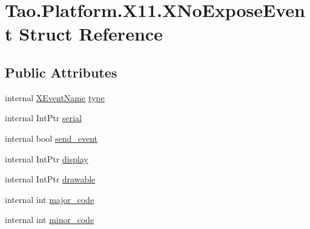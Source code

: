 \hypertarget{struct_tao_1_1_platform_1_1_x11_1_1_x_no_expose_event}{
\section{Tao.Platform.X11.XNoExposeEvent Struct Reference}
\label{struct_tao_1_1_platform_1_1_x11_1_1_x_no_expose_event}
}
\subsection*{Public Attributes}
\begin{DoxyCompactItemize}
\item 
internal \hyperlink{namespace_tao_1_1_platform_1_1_x11_aff81ed5b8778e1ea8e872861dff9f146}{XEventName} \hyperlink{struct_tao_1_1_platform_1_1_x11_1_1_x_no_expose_event_ada56c9399b1ca7dad19d2a1ba246c026}{type}
\item 
internal IntPtr \hyperlink{struct_tao_1_1_platform_1_1_x11_1_1_x_no_expose_event_a3c9a6088bf77089a254525097311eb69}{serial}
\item 
internal bool \hyperlink{struct_tao_1_1_platform_1_1_x11_1_1_x_no_expose_event_acc38f809e10d559bc0f33dc103504b46}{send\_\-event}
\item 
internal IntPtr \hyperlink{struct_tao_1_1_platform_1_1_x11_1_1_x_no_expose_event_a5092fdfef54b3c792bcb97c3c893130f}{display}
\item 
internal IntPtr \hyperlink{struct_tao_1_1_platform_1_1_x11_1_1_x_no_expose_event_a01cf958486a0894186377e2e57673010}{drawable}
\item 
internal int \hyperlink{struct_tao_1_1_platform_1_1_x11_1_1_x_no_expose_event_a1b644e345a353c6f1ba8db995854071e}{major\_\-code}
\item 
internal int \hyperlink{struct_tao_1_1_platform_1_1_x11_1_1_x_no_expose_event_a4aafa728ba5bec496e2479bf52d6ab95}{minor\_\-code}
\end{DoxyCompactItemize}


